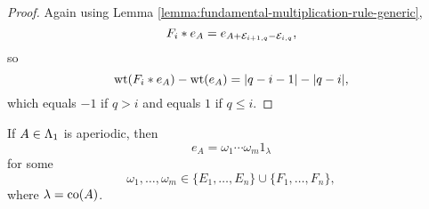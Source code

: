 \documentclass[a4paper, 11pt]{report}
\begin{document}
\begin{proof}
Again using Lemma \ref{lemma:fundamental-multiplication-rule-generic},
\begin{equation*}
F_i\ast e_A = e_{A + \mathcal{E}_{i+1,q} - \mathcal{E}_{i,q}},
\end{equation*}
so
\begin{equation*}
\operatorname{wt}(F_i\ast e_A) - \operatorname{wt}(e_A) = |q-i-1| - |q-i|,
\end{equation*}
which equals $-1$ if $q>i$ and equals $1$ if $q\le i$.
\end{proof}

\begin{lemma}\label{lemma:factorising-aperiodic-elements}
If $A\in\Lambda_1{}$ is aperiodic, then
\begin{equation*}
e_A = \omega_1\cdots\omega_m 1_\lambda
\end{equation*}
for some
\begin{equation*}
\omega_1,\ldots,\omega_m\in\{E_1,\ldots,E_n\}\cup\{F_1,\ldots,F_n\},
\end{equation*}
where $\lambda=\operatorname{co}(A)$.
\end{lemma}
\end{document}
